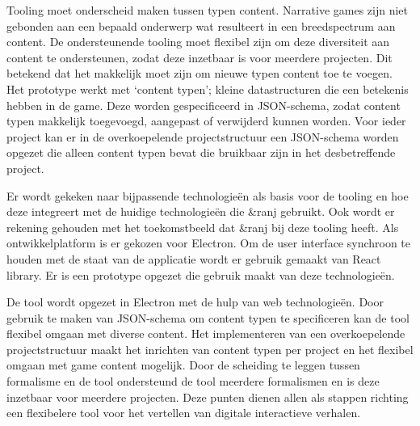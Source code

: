 Tooling moet onderscheid maken tussen typen content. Narrative games zijn niet gebonden aan een bepaald onderwerp wat resulteert in een breedspectrum aan content. De ondersteunende tooling moet flexibel zijn om deze diversiteit aan content te ondersteunen, zodat deze inzetbaar is voor meerdere projecten. Dit betekend dat het makkelijk moet zijn om nieuwe typen content toe te voegen. Het prototype werkt met ‘content typen’; kleine datastructuren die een betekenis hebben in de game. Deze worden gespecificeerd in JSON-schema, zodat content typen makkelijk toegevoegd, aangepast of verwijderd kunnen worden. Voor ieder project kan er in de overkoepelende projectstructuur een JSON-schema worden opgezet die alleen content typen bevat die bruikbaar zijn in het desbetreffende project.

Er wordt gekeken naar bijpassende technologieën als basis voor de tooling en hoe deze integreert met de huidige technologieën die \&ranj gebruikt. Ook wordt er rekening gehouden met het toekomstbeeld dat \&ranj bij deze tooling heeft. Als ontwikkelplatform is er gekozen voor Electron. Om de user interface synchroon te houden met de staat van de applicatie wordt er gebruik gemaakt van React library. Er is een prototype opgezet die gebruik maakt van deze technologieën.

De tool wordt opgezet in Electron met de hulp van web technologieën. Door gebruik te maken van JSON-schema om content typen te specificeren kan de tool flexibel omgaan met diverse content. Het implementeren van een overkoepelende projectstructuur maakt het inrichten van content typen per project en het flexibel omgaan met game content mogelijk. Door de scheiding te leggen tussen formalisme en de tool ondersteund de tool meerdere formalismen en is deze inzetbaar  voor meerdere projecten. Deze punten dienen allen als stappen richting een flexibelere tool voor het vertellen van digitale interactieve verhalen.
